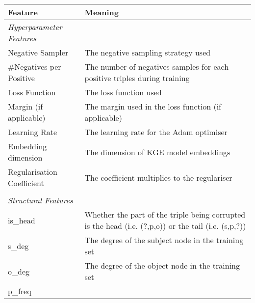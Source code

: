 \begin{table}
    \centering
    \begin{tabular}{p{3cm}|p{5cm}}
         \textbf{Feature}&\textbf{Meaning}\\ \hline
 \textit{Hyperparameter Features}&\\
         Negative Sampler
&The negative sampling strategy used\\
         \#Negatives per Positive
&The number of negatives samples for each positive triples during training\\
         Loss Function
&The loss function used\\
         Margin (if applicable)
&The margin used in the loss function (if applicable)\\
         Learning Rate
&The learning rate for the Adam optimiser\\
         Embedding dimension
&The dimension of KGE model embeddings\\
         Regularisation Coefficient&The coefficient multiplies to the regulariser\\
          &\\
         \textit{Structural Features}&\\
 is\_head&Whether the part of the triple being corrupted is the head (i.e. (?,p,o)) or the tail (i.e. (s,p,?))\\
 s\_deg&The degree of the subject node in the training set\\
 o\_deg&The degree of the object node in the training set\\
 p\_freq&


\end{tabular}
\end{table}
